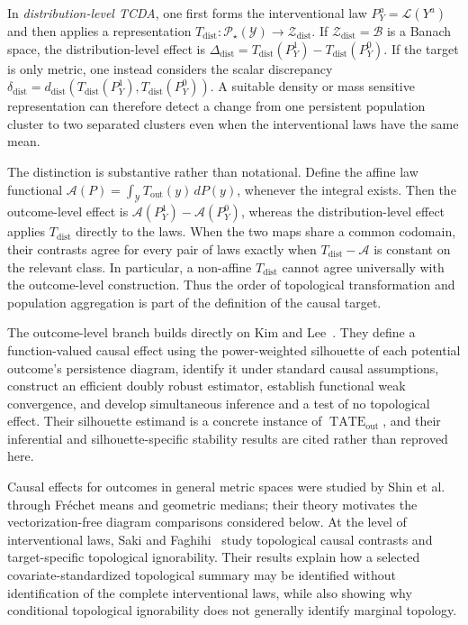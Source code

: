 \documentclass[11pt,a4paper]{article}
\theoremstyle{plain}
\theoremstyle{definition}
\theoremstyle{remark}
\newcommand{\1}{\mathbbm{1}}
\begin{document}
In \emph{distribution-level TCDA}, one first forms the interventional law \(P_Y^a=\mathcal L(Y^a)\) and then applies a representation
\(T_{\mathrm{dist}}: \mathcal P_\star(\mathcal Y)
\longrightarrow \mathcal Z_{\mathrm{dist}}\). If \(\mathcal Z_{\mathrm{dist}}=\mathcal B\) is a Banach space, the distribution-level effect is \(\Delta_{\mathrm{dist}} = T_{\mathrm{dist}}(P_Y^1) - T_{\mathrm{dist}}(P_Y^0)\). If the target is only metric, one instead considers the scalar discrepancy \(\delta_{\mathrm{dist}} = d_{\mathrm{dist}}\!\left(
T_{\mathrm{dist}}(P_Y^1), T_{\mathrm{dist}}(P_Y^0)
\right)\). A suitable density or mass sensitive representation can therefore detect a change from one persistent population cluster to two separated clusters even when the interventional laws have the same mean.

The distinction is substantive rather than notational. Define the affine law functional \(\mathcal A(P) = \int_{\mathcal Y}T_{\mathrm{out}}(y)\,dP(y)\), whenever the integral exists. Then the outcome-level effect is \(\mathcal A(P_Y^1)-\mathcal A(P_Y^0)\), whereas the distribution-level effect applies \(T_{\mathrm{dist}}\) directly to the laws. When the two maps share a common codomain, their contrasts agree for every pair of laws exactly when \(T_{\mathrm{dist}}-\mathcal A\) is constant on the relevant class. In particular, a non-affine \(T_{\mathrm{dist}}\) cannot agree universally with the outcome-level construction. Thus the order of topological transformation and population aggregation is part of the definition of the causal target.

The outcome-level branch builds directly on Kim and Lee~\citep{kimlee2026}. They define a function-valued causal effect using the power-weighted silhouette of each potential outcome's persistence diagram, identify it under standard causal assumptions, construct an efficient doubly robust estimator, establish functional weak convergence, and develop simultaneous inference and a test of no topological effect. Their silhouette estimand is a concrete instance of
\(\operatorname{TATE}_{\mathrm{out}}\), and their inferential and silhouette-specific stability results are cited rather than reproved here.

Causal effects for outcomes in general metric spaces were studied by Shin et al.~\citep{shinetal2024} through Fr\'echet means and geometric medians; their theory motivates the vectorization-free diagram comparisons considered below. At the level of interventional laws, Saki and Faghihi~\citep{sakifaghihi2026} study topological causal contrasts and target-specific topological ignorability. Their results explain how a selected covariate-standardized topological summary may be identified without identification of the complete interventional laws, while also showing why conditional topological ignorability does not generally identify marginal topology.
\end{document}

